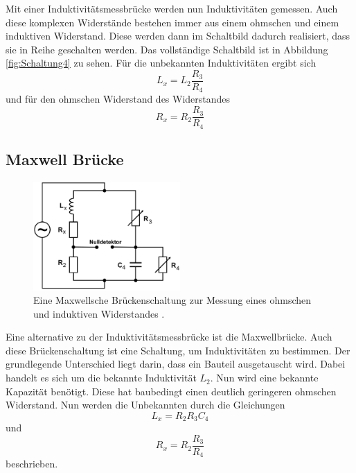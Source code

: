 Mit einer Induktivitätsmessbrücke werden nun Induktivitäten gemessen.
Auch diese komplexen Widerstände bestehen immer aus einem ohmschen und einem induktiven Widerstand.
Diese werden dann im Schaltbild dadurch realisiert, dass sie in Reihe geschalten werden.
Das vollständige Schaltbild ist in Abbildung \ref{fig:Schaltung4} zu sehen.
Für die unbekannten Induktivitäten ergibt sich
\begin{equation}
    L_x = L_2 \frac{R_3}{R_4}
\end{equation}
und für den ohmschen Widerstand des Widerstandes
\begin{equation}
    R_x = R_2 \frac{R_3}{R_4}
\end{equation}

\subsection{Maxwell Brücke}
\begin{figure}
    \centering
    \includegraphics[width=0.5\textwidth]{pictures/Schaltung5.png}
    \caption{Eine Maxwellsche Brückenschaltung zur Messung eines ohmschen und induktiven Widerstandes \cite[7]{v302}.}
    \label{fig:Schaltung5}
\end{figure}

Eine alternative zu der Induktivitätsmessbrücke ist die Maxwellbrücke.
Auch diese Brückenschaltung ist eine Schaltung, um Induktivitäten zu bestimmen.
Der grundlegende Unterschied liegt darin, dass ein Bauteil ausgetauscht wird.
Dabei handelt es sich um die bekannte Induktivität $L_2$.
Nun wird eine bekannte Kapazität benötigt.
Diese hat baubedingt einen deutlich geringeren ohmschen Widerstand.
Nun werden die Unbekannten durch die Gleichungen
\begin{equation}
    L_x = R_2 R_3 C_4
\end{equation}
und 
\begin{equation}
    R_x = R_2 \frac{R_3}{R_4}
\end{equation}
beschrieben.

